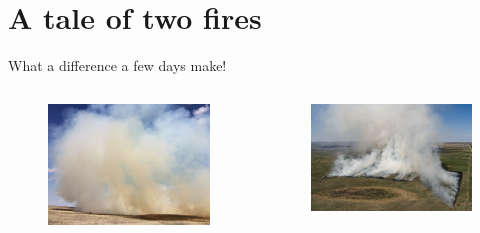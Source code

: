 \documentclass[11pt]{beamer}
\begin{document}
\section{A tale of two fires}

\begin{frame}{What a difference a few days make! } 
	\begin{columns}
		\begin{column}{0.5\textwidth}
				\begin{center}
				\begin{figure}
					\includegraphics[width=0.9\linewidth]{figs/GoodBurn} 
				\end{figure}
			\end{center}
		\end{column}
		\begin{column}{0.5\textwidth}  
			\begin{center}
				\begin{figure}
					\includegraphics[width=1\linewidth]{figs/StreeterFire_17}  

\end{figure}
\end{center}
\end{column}
\end{columns}
\end{frame}
\end{document}
